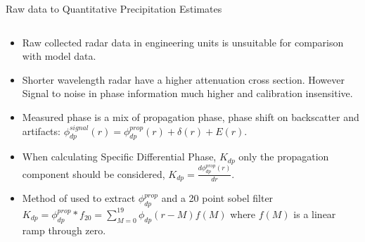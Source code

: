 \documentclass[final]{beamer}
\begin{document}
\begin{frame}{}
\begin{columns}[t]
\begin{column}{.3\linewidth}
     \begin{block}{Raw data to Quantitative Precipitation Estimates}
 	\begin{columns}[t]
		\begin{column}{.4\linewidth}
		\begin{itemize}
		\item Raw collected radar data in engineering units is unsuitable for comparison with model data. 
		\item Shorter wavelength radar have a higher attenuation cross section. However Signal to noise in phase information much higher and calibration insensitive.
		\item Measured phase is a mix of propagation phase, phase shift on backscatter and artifacts: {\tiny $\phi_{dp}^{signal}(r) = \phi_{dp}^{prop}(r) + \delta(r) + E(r)$}.
		\item When calculating Specific Differential Phase, {\small $K_{dp}$} only the propagation component should be considered, {\tiny $K_{dp} = \frac{d\phi_{dp}^{prop}(r)}{dr}$}.
		\item Method of \citet{giangrande_application_2013} used to extract {\small $\phi_{dp}^{prop}$} and a 20 point sobel filter 
		{\tiny$K_{dp} = \phi_{dp}^{prop} \ast f_{20} = \sum\limits_{M=0}^{19}   \phi_{dp}(r-M)f(M)$} where $f(M)$ is a linear ramp through zero. 
		

\end{itemize}
\end{column}
\end{columns}
\end{block}
\end{column}
\end{columns}
\end{frame}
\end{document}
